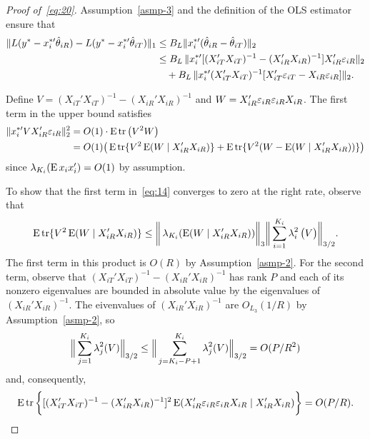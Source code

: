 \documentclass[12pt]{article}
\begin{document}
\begin{proof}[Proof of~\eqref{eq:20}]
Assumption~\ref{asmp-3} and the definition of the OLS estimator
ensure that
\begin{align*}
  \|L(y^{*} -  x_i^{*\prime} \hat\theta_{iR}) - L(y^{*} - x_i^{*\prime} \hat\theta_{iT}) \|_1
  &\leq B_{L} \| x_i^{*\prime} (\hat\theta_{iR} - \hat\theta_{iT}) \|_2 \\
  &\leq B_{L} \, \| x_i^{*\prime} [(X_{iT}'X_{iT})^{-1} -
  (X_{iR}'X_{iR})^{-1}] X_{iR}' \mathbf{\varepsilon}_{iR} \|_2 \\
  &\quad+ B_L \, \| x_i^{*\prime}
  (X_{iT}'X_{iT})^{-1}[X_{iT}'\mathbf{\varepsilon}_{iT} - X_{iR}
  \mathbf{\varepsilon}_{iR} ] \|_2 .
\end{align*}

Define $V = (X_{iT}'X_{iT})^{-1} - (X_{iR}'X_{iR})^{-1}$ and $W =
X_{iR}'\mathbf{\varepsilon}_{iR} \mathbf{\varepsilon}_{iR}X_{iR}$. The first term in the upper bound
satisfies
\begin{align}
  \| x_i^{*\prime} V X_{iR}' \mathbf{\varepsilon}_{iR} \|_2^2
  &= O(1) \cdot \operatorname{E} \operatorname{tr}\big( V^2 W \big) \\
  \label{eq:14}
  &= O(1) \big( \operatorname{E} \operatorname{tr}\{ V^2 \operatorname{E}(W \mid X_{iR}'X_{iR})\}
  + \operatorname{E} \operatorname{tr}\{ V^2 (W - \operatorname{E}(W \mid X_{iR}'X_{iR}))\}\big)
\end{align}
since $\operatorname{\lambda}_{K_i}(\operatorname{E} x_i x_i') = O(1)$ by assumption.

To show that the first term in~\eqref{eq:14} converges to zero at the
right rate, observe that
\begin{equation}
  \operatorname{E} \operatorname{tr}\{ V^2 \operatorname{E}(W \mid X_{iR}'X_{iR})\}
  \leq \bigg\rVert
  \operatorname{\lambda}_{K_i}(\operatorname{E}(W \mid X_{iR}'X_{iR})) \bigg\rVert_3
  \bigg\rVert \sum_{i=1}^{K_i} \operatorname{\lambda}_i^2 \big(V\big) \bigg\rVert_{3/2}.
\end{equation}
The first term in this product is $O(R)$ by
Assumption~\ref{asmp-2}. For the second term, observe that
$(X_{iT}'X_{iT})^{-1} - (X_{iR}'X_{iR})^{-1}$ has rank $P$ and
each of its nonzero eigenvalues are bounded in absolute value by the
eigenvalues of $(X_{iR}'X_{iR})^{-1}$. The eivenvalues of
$(X_{iR}'X_{iR})^{-1}$ are $O_{L_3}(1/R)$ by Assumption~\ref{asmp-2}, so
\begin{equation*}
  \Big\|\sum_{j=1}^{K_i}
  \operatorname{\lambda}_j^2(V)\Big\|_{3/2}
  \leq \Big\|\sum_{j=K_i - P+1}^{K_i} \operatorname{\lambda}_j^2(V) \Big\|_{3/2}
  = O(P/R^2)
\end{equation*}
and, consequently,
\begin{equation*}
  \operatorname{E} \operatorname{tr}\bigg\{
  [(X_{iT}'X_{iT})^{-1} - (X_{iR}'X_{iR})^{-1}]^2
  \operatorname{E}(X_{iR}'\mathbf{\varepsilon}_{iR} \mathbf{\varepsilon}_{iR}X_{iR} \mid X_{iR}'X_{iR})\bigg\} = O(P/R).
\end{equation*}


\end{proof}
\end{document}
